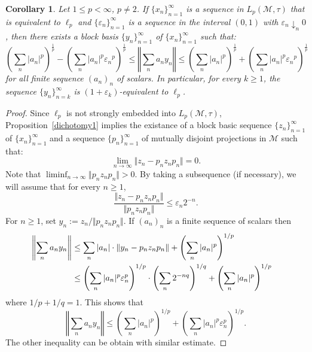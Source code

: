 \documentclass[12pt]{amsart}
\let\cal\mathcal
\newtheorem{corollary}[theorem]{Corollary}
\def\m{{\cal M}}
\numberwithin{equation}{section}
\numberwithin{theorem}{section}
\begin{document}
\begin{corollary}
Let $1\leq p <\infty$, $p\neq 2$. If $\{x_n\}_{n=1}^\infty$ is a sequence in $L_p(\m,\tau)$
that is equivalent to $\ell_p$ and $\{\varepsilon_n\}_{n=1}^\infty$ 
is a sequence in
the interval $(0, 1)$ with $\varepsilon_n \downarrow_n 0$, then there 
exists a block basis  $\{y_n\}_{n=1}^\infty$ of $\{x_n\}_{n=1}^\infty$ 
such that:
\begin{equation*}
\left(\sum_n \vert a_n \vert^p\right)^{\frac{1}{p}} -
\left(\sum_n \vert a_n \vert^p {\varepsilon_n}^p\right)^{\frac{1}{p}}
\leq \left\Vert \sum_n a_ny_n \right\Vert
\leq \left(\sum_n \vert a_n \vert^p\right)^{\frac{1}{p}} +
\left(\sum_n \vert a_n \vert^p {\varepsilon_n}^p\right)^{\frac{1}{p}}
\end{equation*}
for all finite sequence $(a_n)_n$ of scalars. In particular,
for every $k\geq 1$,  the sequence 
$\{y_n\}_{n=k}^\infty$ is $(1+\varepsilon_k)$-equivalent to $\ell_p$.
\end{corollary}
\begin{proof}
Since $\ell_p$ is not strongly embedded into $L_p(\m,\tau)$,
Proposition~\ref{dichotomy1} implies the existance of a block basic sequence
$\{z_n\}_{n=1}^\infty$ of $\{x_n\}_{n=1}^\infty$ and a sequence
$\{p_n\}_{n=1}^\infty$ of mutually disjoint projections in
$\m$ such that:
$$\lim_{n \to \infty} \Vert z_n - p_nz_np_n \Vert=0.$$
Note that $\liminf_{n \to \infty} \Vert p_nz_np_n \Vert >0$. 
By taking a subsequence (if necessary), we will assume that for
every $n \geq 1$,
$$\frac{\Vert z_n -p_nz_np_n \Vert}{\Vert p_nz_np_n\Vert} \leq
\varepsilon_n 2^{-n}.$$
For $n\geq 1$, set $y_n:= z_n/\Vert p_nz_np_n \Vert$.
If $(a_n)_n$ is a finite sequence of scalars then
\begin{equation*}
\begin{split}
\left\Vert \sum_n a_ny_n \right\Vert &\leq
\sum_n \vert a_n \vert \cdot 
\left\Vert y_n - p_nz_np_n\right\Vert  +
 \left(\sum_n \vert a_n \vert^p\right)^{1/p} \cr
&\leq \left(\sum_n \vert a_n \vert^p \varepsilon_{n}^p\right)^{1/p}
\cdot \left(\sum_n  2^{-nq} \right)^{1/q} +
\left(\sum_n \vert a_n \vert^p\right)^{1/p}
\end{split}
\end{equation*}
where $1/p +1/q =1$. This shows that
$$\left\Vert \sum_n a_ny_n \right\Vert \leq 
\left(\sum_n \vert a_n \vert^p\right)^{1/p} +
\left(\sum_n \vert a_n \vert^p\varepsilon_{n}^p\right)^{1/p}.$$
The other inequality can be obtain with similar estimate.
\end{proof}
\end{document}
